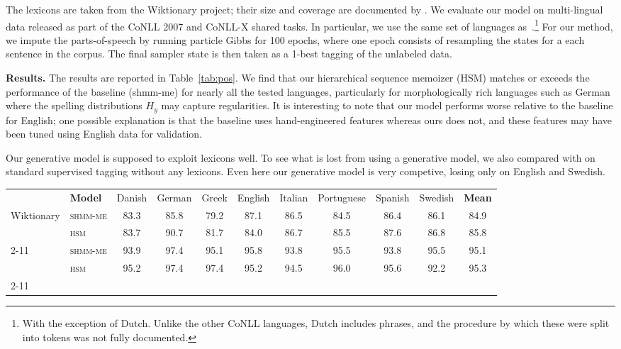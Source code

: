 \documentclass[11pt]{article}
\newcommand{\ra}[1]{\renewcommand{\arraystretch}{#1}}
\newcommand*\cbottomrule[1]{\cmidrule[\heavyrulewidth]{#1}\addlinespace}
\newcommand*\ctoprule[1]{\addlinespace\cmidrule[\heavyrulewidth]{#1}}
\begin{document}
The lexicons are taken from the Wiktionary project; their size and coverage are
documented by \cite{li2012wiki}. 
We evaluate our model on multi-lingual data released as part of the
CoNLL 2007 and CoNLL-X shared tasks.  In particular, we use the same
set of languages as~.\footnote{With the exception of
Dutch.  Unlike the other CoNLL languages, Dutch includes
  phrases, and the procedure by which these were split into tokens was
  not fully documented.} For our method, we impute the parts-of-speech by running particle Gibbs for 100 epochs, where one epoch consists of resampling the states for a each sentence in the corpus. The final sampler state is then taken as a 1-best tagging of the unlabeled data.

  \vspace{5pt}

  \noindent \textbf{Results.} The results are reported in Table~\ref{tab:pos}. We find that our hierarchical sequence memoizer ({\sc HSM}) matches or exceeds the performance of the baseline ({\sc shmm-me}) for nearly all the tested languages, particularly for morphologically rich languages such as German where the spelling distributions $H_y$ may capture regularities. It is interesting to note that our model performs worse relative to the baseline for English; one possible explanation is that the baseline uses hand-engineered features whereas ours does not, and these features may have been tuned using English data for validation. 

  Our generative model is supposed to exploit lexicons well.  To see what is lost from using a generative model, we also compared with  on standard supervised tagging without any lexicons. 
  Even here our generative model is very competive, losing only on English and Swedish.  

\begin{table*}\centering
\small
\ra{1.17}
\begin{tabular}{ll*{8}{c}|c} \ctoprule{2-11}
 & {\small \bf Model}		& \small Danish 	& \small German	& \small Greek 	& \small English	& \small Italian	& \small Portuguese	& \small Spanish	& \small Swedish & \textbf{Mean} \\ 
\multirow{2}{*}{\small Wiktionary} & \small \textsc{shmm-me} 	& 83.3          & 85.8         & 79.2        & 87.1 & 86.5        & 84.5        & 86.4        & 86.1   & 84.9 \\
   & \small \textsc{hsm}                                                                 & 83.7  & 90.7 & 81.7 & 84.0 & 86.7 & 85.5 & 87.6 & 86.8 & 85.8  \\ \cmidrule{2-11}
\multirow{2}{*}{\small Supervised} & \small \textsc{shmm-me}	& 93.9	& 97.4 	& 95.1	& 95.8 	& 93.8	& 95.5		& 93.8	& 95.5	& 95.1 \\
  & \small \textsc{hsm} 		& 95.2  & 97.4	& 97.4	& 95.2		& 94.5	& 96.0	& 95.6	& 92.2 & 95.3		 \\
\cbottomrule{2-11}
\end{tabular}
\vspace{-\baselineskip}
\caption{Part-of-speech induction results in multiple languages.}\label{tab:pos}
\end{table*}
\end{document}
